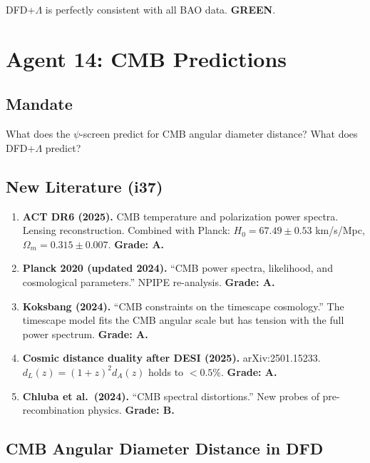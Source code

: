 \documentclass[11pt,a4paper]{article}
\newcommand{\GREEN}{\textcolor{dfdgreen}{\textbf{GREEN}}}
\begin{document}
DFD+$\Lambda$ is perfectly consistent with all BAO data. \GREEN.

\newpage
\section{Agent 14: CMB Predictions}
\label{sec:agent14}

\subsection{Mandate}

What does the $\psi$-screen predict for CMB angular diameter distance? What does DFD+$\Lambda$ predict?

\subsection{New Literature (i37)}

\begin{enumerate}
\item \textbf{ACT DR6 (2025).} CMB temperature and polarization power spectra. Lensing reconstruction. Combined with Planck: $H_0 = 67.49 \pm 0.53$ km/s/Mpc, $\Omega_m = 0.315 \pm 0.007$. \textbf{Grade: A.}

\item \textbf{Planck 2020 (updated 2024).} ``CMB power spectra, likelihood, and cosmological parameters.'' NPIPE re-analysis. \textbf{Grade: A.}

\item \textbf{Koksbang (2024).} ``CMB constraints on the timescape cosmology.'' The timescape model fits the CMB angular scale but has tension with the full power spectrum. \textbf{Grade: A.}

\item \textbf{Cosmic distance duality after DESI (2025).} arXiv:2501.15233. $d_L(z) = (1+z)^2 d_A(z)$ holds to $< 0.5\%$. \textbf{Grade: A.}

\item \textbf{Chluba et al.\ (2024).} ``CMB spectral distortions.'' New probes of pre-recombination physics. \textbf{Grade: B.}
\end{enumerate}

\subsection{CMB Angular Diameter Distance in DFD}
\end{document}
